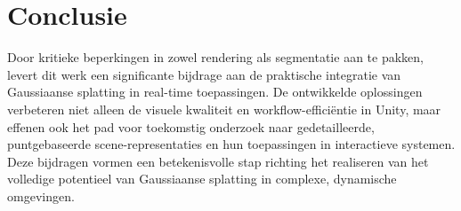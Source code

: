 \documentclass[twocolumn]{article}
\begin{document}
	\section{Conclusie}
Door kritieke beperkingen in zowel rendering als segmentatie aan te pakken, levert dit werk een significante bijdrage aan de praktische integratie van Gaussiaanse splatting in real-time toepassingen. De ontwikkelde oplossingen verbeteren niet alleen de visuele kwaliteit en workflow-efficiëntie in Unity, maar effenen ook het pad voor toekomstig onderzoek naar gedetailleerde, puntgebaseerde scene-representaties en hun toepassingen in interactieve systemen. Deze bijdragen vormen een betekenisvolle stap richting het realiseren van het volledige potentieel van Gaussiaanse splatting in complexe, dynamische omgevingen.




\end{document}
